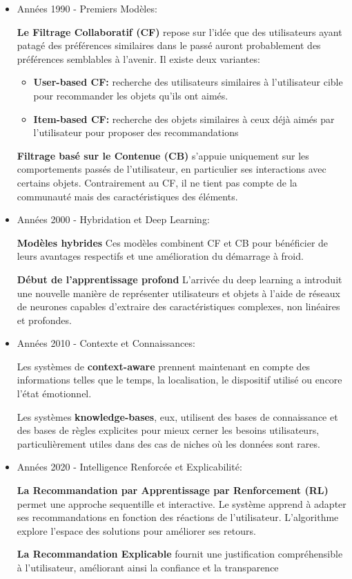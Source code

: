 \documentclass{article}
\begin{document}
    \begin{itemize}
        \item Années 1990 - Premiers Modèles:

        \textbf{Le Filtrage Collaboratif (CF)} repose sur l'idée que des utilisateurs ayant patagé des préférences similaires dans le passé auront probablement des préférences semblables à l'avenir. Il existe deux variantes:
        \begin{itemize}
            \item \textbf{User-based CF: }recherche des utilisateurs similaires à l'utilisateur cible pour recommander les objets qu'ils ont aimés.
            \item \textbf{Item-based CF: }recherche des objets similaires à ceux déjà aimés par l'utilisateur pour proposer des recommandations
        \end{itemize}
        \textbf{Filtrage basé sur le Contenue (CB)} s'appuie uniquement sur les comportements passés de l'utilisateur, en particulier ses interactions avec certains objets. Contrairement au CF, il ne tient pas compte de la communauté mais des caractéristiques des éléments.
        \newline

        \item Années 2000 - Hybridation et Deep Learning:

        \textbf{Modèles hybrides} Ces modèles combinent CF et CB pour bénéficier de leurs avantages respectifs et une amélioration du démarrage à froid.

        \textbf{Début de l'apprentissage profond} L'arrivée du deep learning a introduit une nouvelle manière de représenter utilisateurs et objets à l'aide de réseaux de neurones capables d'extraire des caractéristiques complexes, non linéaires et profondes.
        \newline
        \item Années 2010 - Contexte et Connaissances:

        Les systèmes de \textbf{context-aware} prennent maintenant en compte des informations telles que le temps, la localisation, le dispositif utilisé ou encore l'état émotionnel.

        Les systèmes \textbf{knowledge-bases}, eux, utilisent des bases de connaissance et des bases de règles explicites pour mieux cerner les besoins utilisateurs, particulièrement utiles dans des cas de niches où les données sont rares.
        \newline
        \item Années 2020 - Intelligence Renforcée et Explicabilité:

        \textbf{La Recommandation par Apprentissage par Renforcement (RL)} permet une approche sequentille et interactive. Le système apprend à adapter ses recommandations en fonction des réactions de l'utilisateur. L'algorithme explore l'espace des solutions pour améliorer ses retours.

        \textbf{La Recommandation Explicable} fournit une justification compréhensible à l'utilisateur, améliorant ainsi la confiance et la transparence
    \end{itemize}
\end{document}
